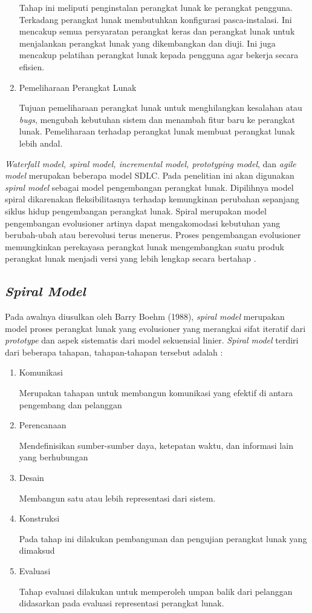 \begin{enumerate}
	Tahap ini meliputi penginstalan perangkat lunak ke perangkat pengguna. Terkadang perangkat lunak membutuhkan konfigurasi pasca-instalasi. Ini mencakup semua persyaratan perangkat keras dan perangkat lunak untuk menjalankan perangkat lunak yang dikembangkan dan diuji. Ini juga mencakup pelatihan perangkat lunak kepada pengguna agar bekerja secara efisien.
	\item Pemeliharaan Perangkat Lunak
	
	Tujuan pemeliharaan perangkat lunak untuk menghilangkan kesalahan atau \textit{bugs}, mengubah kebutuhan sistem dan menambah fitur baru ke perangkat lunak. Pemeliharaan terhadap perangkat lunak membuat perangkat lunak lebih andal.
\end{enumerate}
  
\textit{Waterfall model, spiral model, incremental model, prototyping model}, dan \textit{agile model} merupakan beberapa model SDLC. Pada penelitian ini akan digunakan \textit{spiral model} sebagai model pengembangan perangkat lunak. Dipilihnya model spiral dikarenakan fleksibilitasnya terhadap kemungkinan perubahan sepanjang siklus hidup pengembangan perangkat lunak. Spiral merupakan model pengembangan evolusioner artinya dapat mengakomodasi kebutuhan yang berubah-ubah atau berevolusi terus menerus. Proses pengembangan evolusioner memungkinkan perekayasa perangkat lunak mengembangkan suatu produk perangkat lunak menjadi versi yang lebih lengkap secara bertahap \cite{Made}. 


\subsection{\emph{Spiral Model}} 

Pada awalnya diusulkan oleh Barry Boehm (1988), \textit{spiral model} merupakan model proses perangkat lunak yang evolusioner yang merangkai sifat iteratif dari \textit{prototype} dan aspek sistematis dari model sekuensial linier. \textit{Spiral model} terdiri dari beberapa tahapan, tahapan-tahapan tersebut adalah \cite{Pressman}:

\begin{enumerate}
	\item Komunikasi

	Merupakan tahapan untuk membangun komunikasi yang efektif di antara pengembang dan pelanggan
	\item Perencanaan
	
	Mendefinisikan sumber-sumber daya, ketepatan waktu, dan informasi lain yang berhubungan
	\item Desain
	
	Membangun satu atau lebih representasi dari sistem. 
	\item Konstruksi 
	
	Pada tahap ini dilakukan pembangunan dan pengujian perangkat lunak yang dimaksud
	\item Evaluasi
	
	Tahap evaluasi dilakukan untuk memperoleh umpan balik dari pelanggan didasarkan pada evaluasi representasi perangkat lunak.
\end{enumerate}

